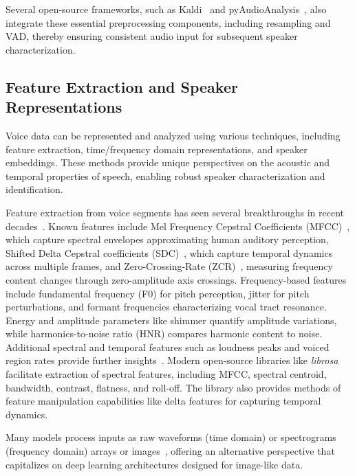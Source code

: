 Several open-source frameworks, such as Kaldi~\cite{Povey_ASRU2011} and pyAudioAnalysis~\cite{giannakopoulos2015pyaudioanalysis}, also integrate these essential preprocessing components, including resampling and VAD, thereby ensuring consistent audio input for subsequent speaker
characterization.

\subsection{Feature Extraction and Speaker Representations}

Voice data can be represented and analyzed using various techniques, including feature extraction, time/frequency domain representations, and speaker embeddings. These methods provide unique perspectives on the acoustic and temporal properties of speech, enabling robust speaker characterization and identification.

Feature extraction from voice segments has seen several breakthroughs in recent decades~\cite{8882461, prabakaran2019review, li2019vocal, al2019new, TIRUMALA2017250}. Known features include Mel Frequency Cepstral Coefficients (MFCC)~\cite{tiwari2010mfcc, ganchev2005comparative, nakagawa2011speaker}, which capture spectral envelopes approximating human auditory perception, Shifted Delta Cepstral coefficients (SDC)~\cite{torres2002approaches}, which capture temporal dynamics across multiple frames, and Zero-Crossing-Rate (ZCR)~\cite{khan2012hindi, ramaiah2016multi}, measuring frequency content changes through zero-amplitude axis crossings. Frequency-based features include fundamental frequency (F0) for pitch perception, jitter for pitch perturbations, and formant frequencies characterizing vocal tract resonance. Energy and amplitude parameters like shimmer quantify amplitude variations, while harmonics-to-noise ratio (HNR) compares harmonic content to noise. Additional spectral and temporal features such as loudness peaks and voiced region rates provide further insights~\cite{eyben2015geneva}. Modern open-source libraries like \textit{librosa}~\cite{brian_mcfee_2022_6097378} facilitate extraction of spectral features, including MFCC, spectral centroid, bandwidth, contrast, flatness, and roll-off. The library also provides methods of feature manipulation capabilities like delta features for capturing temporal dynamics. 

Many models process inputs as raw waveforms (time domain) or spectrograms (frequency domain) arrays or images~\cite{jia2021speaker, zhang2018text, nagrani2017voxceleb, palaz2015analysis, muckenhirn2018towards, 8639585}, offering an alternative perspective that capitalizes on deep learning architectures designed for image-like data.

